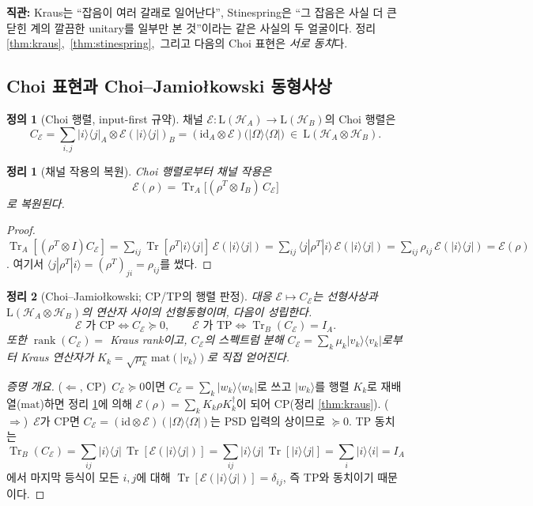 \documentclass[11pt,a4paper]{article}
\newcommand{\E}{\mathcal{E}}
\newcommand{\Hcal}{\mathcal{H}}
\newcommand{\Tr}{\operatorname{Tr}}
\newcommand{\id}{\mathrm{id}}
\newcommand{\Lin}{\mathrm{L}}
\newcommand{\rank}{\operatorname{rank}}
\theoremstyle{definition}
\newtheorem{definition}{정의}[section]
\theoremstyle{plain}
\newtheorem{theorem}{정리}[section]
\theoremstyle{remark}
\begin{document}
\begin{intuitionbox}
\textbf{직관:} Kraus는 ``잡음이 여러 갈래로 일어난다'', Stinespring은 ``그 잡음은 사실 더 큰 닫힌 계의 깔끔한 unitary를 일부만 본 것''이라는 같은 사실의 두 얼굴이다. 정리 \ref{thm:kraus},~\ref{thm:stinespring},~그리고 다음의 Choi 표현은 \emph{서로 동치}다.
\end{intuitionbox}

\subsection{Choi 표현과 Choi--Jamio{\l}kowski 동형사상}

\begin{definition}[Choi 행렬, input-first 규약]
채널 $\E:\Lin(\Hcal_A)\to\Lin(\Hcal_B)$의 Choi 행렬은
\[
C_\E=\sum_{i,j}|i\rangle\langle j|_A\otimes\E(|i\rangle\langle j|)_B
     =(\id_A\otimes\E)\big(|\Omega\rangle\langle\Omega|\big)\ \in\ \Lin(\Hcal_A\otimes\Hcal_B).
\]
\end{definition}

\begin{theorem}[채널 작용의 복원]\label{thm:recover}
Choi 행렬로부터 채널 작용은
\[
\E(\rho)=\Tr_A\!\big[(\rho^{T}\otimes I_B)\,C_\E\big]
\]
로 복원된다.
\end{theorem}
\begin{proof}
$\Tr_A[(\rho^T\otimes I)C_\E]=\sum_{ij}\Tr[\rho^T|i\rangle\langle j|]\,\E(|i\rangle\langle j|)=\sum_{ij}\langle j|\rho^T|i\rangle\,\E(|i\rangle\langle j|)=\sum_{ij}\rho_{ij}\,\E(|i\rangle\langle j|)=\E(\rho)$. 여기서 $\langle j|\rho^T|i\rangle=(\rho^T)_{ji}=\rho_{ij}$를 썼다.
\end{proof}

\begin{theorem}[Choi--Jamio{\l}kowski; CP/TP의 행렬 판정]\label{thm:cj}
대응 $\E\mapsto C_\E$는 선형사상과 $\Lin(\Hcal_A\otimes\Hcal_B)$의 연산자 사이의 선형동형이며, 다음이 성립한다.
\[
\boxed{\ \E\text{ 가 CP}\iff C_\E\succeq0,\qquad
       \E\text{ 가 TP}\iff \Tr_B(C_\E)=I_A.\ }
\]
또한 $\rank(C_\E)=$ Kraus rank이고, $C_\E$의 스펙트럼 분해 $C_\E=\sum_k\mu_k|v_k\rangle\langle v_k|$로부터 Kraus 연산자가 $K_k=\sqrt{\mu_k}\,\mathrm{mat}(|v_k\rangle)$로 직접 얻어진다.
\end{theorem}

\begin{proof}[증명 개요]
($\Leftarrow$, CP)~$C_\E\succeq0$이면 $C_\E=\sum_k|w_k\rangle\langle w_k|$로 쓰고 $|w_k\rangle$를 행렬 $K_k$로 재배열($\mathrm{mat}$)하면 정리 \ref{thm:recover}에 의해 $\E(\rho)=\sum_k K_k\rho K_k^\dagger$이 되어 CP(정리 \ref{thm:kraus}). ($\Rightarrow$)~$\E$가 CP면 $C_\E=(\id\otimes\E)(|\Omega\rangle\langle\Omega|)$는 PSD 입력의 상이므로 $\succeq0$. TP 동치는
\[
\Tr_B(C_\E)=\sum_{ij}|i\rangle\langle j|\,\Tr[\E(|i\rangle\langle j|)]
=\sum_{ij}|i\rangle\langle j|\,\Tr[|i\rangle\langle j|]
=\sum_i|i\rangle\langle i|=I_A
\]
에서 마지막 등식이 모든 $i,j$에 대해 $\Tr[\E(|i\rangle\langle j|)]=\delta_{ij}$, 즉 TP와 동치이기 때문이다.
\end{proof}
\end{document}
